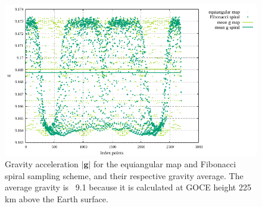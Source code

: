 \begin{figure}[h!]
\centering
\includegraphics[scale=1.1]{../../benchmarks/gravity_prem/doc/stats_gravity_prem_g.pdf}
\caption{Gravity acceleration $|{\mathbf g}|$ for the equiangular map and Fibonacci spiral sampling scheme, and their respective gravity average. The average gravity is ~9.1 because it is calculated at GOCE height 225 km above the Earth surface.}
\label{fig:gravityprem}
\end{figure}
